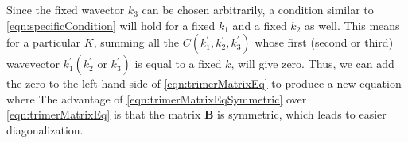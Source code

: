 Since the fixed wavector $k_3$ can be chosen arbitrarily, a condition similar to  \autoref{eqn:specificCondition} will
hold for a fixed $k_1$ and a fixed $k_2$ as well. This means  for a particular $K$, summing all  the 
$C(k_1^{'}, k_2^{'}, k_3^{'})$ whose first (second or third) wavevector $k_1^{'} ( k_2^{'} \mbox{ or }  k_3^{'})$ is equal to a fixed $k$, will give zero. Thus, we can add the zero
 to the left hand side of \autoref{eqn:trimerMatrixEq} to produce a new equation
where
The advantage of \autoref{eqn:trimerMatrixEqSymmetric} over \autoref{eqn:trimerMatrixEq} is that the matrix
$\mathbf{B}$ is symmetric, which leads to easier diagonalization. 

